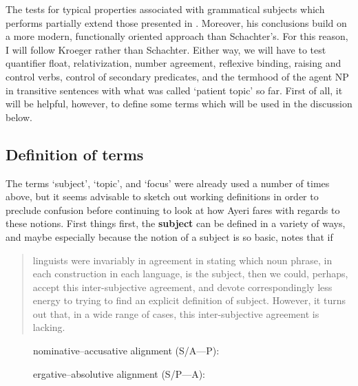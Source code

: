 The tests for typical properties associated with grammatical subjects which
\citet{kroeger1991} performs partially extend those presented in
\citet{schachter1976}. Moreover, his conclusions build on a more modern,
functionally oriented approach than Schachter's. For this reason, I will follow
Kroeger rather than Schachter. Either way, we will have to test quantifier
float, relativization, number agreement, reflexive binding, raising and control
verbs, control of secondary predicates, and the termhood of the agent NP in
transitive sentences with what was called `patient topic' so far. First of all,
it will be helpful, however, to define some terms which will be used in the
discussion below.

\subsection{Definition of terms}

The terms `subject', `topic', and `focus' were already used a number of times
above, but it seems advisable to sketch out working definitions in order to
preclude confusion before continuing to look at how Ayeri fares with regards to
these notions. First things first, the \textbf{subject} can be defined in a
variety of ways, and maybe especially because the notion of a subject is so
basic, \citet{comrie1989} notes that if

\blockcquote[104]{comrie1989}{linguists were invariably in agreement in stating
which noun phrase, in each construction in each language, is the subject, then
we could, perhaps, accept this inter-subjective agreement, and devote
correspondingly less energy to trying to find an explicit definition of
subject. However, it turns out that, in a wide range of cases, this
inter-subjective agreement is lacking.}

\begin{figure}[t]
\pex\label{ex:subject}
\a\label{ex:subject_nomacc}%
nominative--accusative alignment (S/A---P):\medskip


\a\label{ex:subject_abserg}%
ergative--absolutive alignment (S/P---A):\medskip


\xe
\end{figure}

